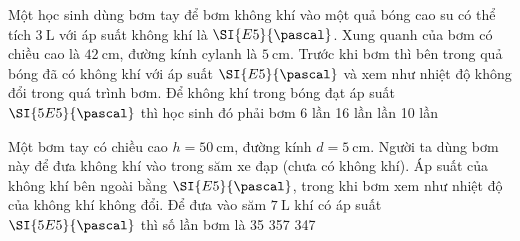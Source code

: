 \begin{ex}
	Một học sinh dùng bơm tay để bơm không khí vào một quả bóng cao su có thể tích $\SI{3}{\liter}$ với áp suất không khí là $\SI{E5}{\pascal}$. Xung quanh của bơm có chiều cao là $\SI{42}{\centi\meter}$, đường kính cylanh là $\SI{5}{\centi\meter}$. Trước khi bơm thì bên trong quả bóng đã có không khí với áp suất $\SI{E5}{\pascal}$ và xem như nhiệt độ không đổi trong quá trình bơm. Để không khí trong bóng đạt áp suất $\SI{5E5}{\pascal}$ thì học sinh đó phải bơm
	\choice
	{6 lần}
	{16 lần}
	{ lần}
	{10 lần}
\end{ex}
\begin{ex}
Một bơm tay có chiều cao $h=\SI{50}{\centi\meter}$, đường kính $d=\SI{5}{\centi\meter}$. Người ta dùng bơm này để đưa không khí vào trong săm xe đạp (chưa có không khí). Áp suất của không khí bên ngoài bằng $\SI{E5}{\pascal}$, trong khi bơm xem như nhiệt độ của không khí không đổi. Để đưa vào săm $\SI{7}{\liter}$ khí có áp suất $\SI{5E5}{\pascal}$ thì số lần bơm là	
	\choice
	{35}
	{}
	{357}
	{347}
\end{ex}
